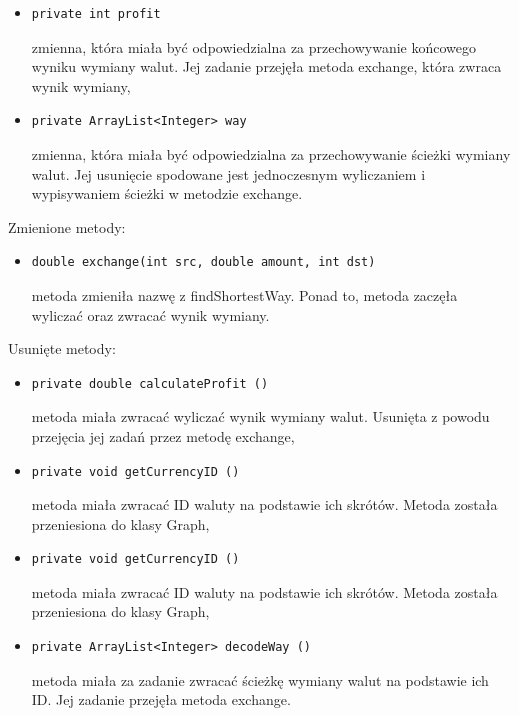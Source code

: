 \documentclass[12pt]{article}
\begin{document}
\begin{enumerate}
\begin{itemize}
    \end{itemize}
    \begin{itemize}
     \item \begin{verbatim}private int profit\end{verbatim}
        zmienna, która miała być odpowiedzialna za przechowywanie końcowego wyniku wymiany walut. Jej zadanie przejęła metoda exchange, która zwraca wynik wymiany,
    \end{itemize}
    \begin{itemize}
     \item \begin{verbatim}private ArrayList<Integer> way\end{verbatim}
        zmienna, która miała być odpowiedzialna za przechowywanie ścieżki wymiany walut. Jej usunięcie spodowane jest jednoczesnym wyliczaniem i wypisywaniem ścieżki w metodzie exchange.
    \end{itemize}
    Zmienione metody:
    \begin{itemize}
     \item \begin{verbatim}double exchange(int src, double amount, int dst)\end{verbatim}
        metoda zmieniła nazwę z findShortestWay. Ponad to, metoda zaczęła wyliczać oraz zwracać wynik wymiany.
    \end{itemize}
    Usunięte metody:
    \begin{itemize}
     \item \begin{verbatim}private double calculateProfit ()\end{verbatim}
        metoda miała zwracać wyliczać wynik wymiany walut. Usunięta z powodu przejęcia jej zadań przez metodę exchange,
    \end{itemize}
    \begin{itemize}
     \item \begin{verbatim}private void getCurrencyID ()\end{verbatim}
        metoda miała zwracać ID waluty na podstawie ich skrótów. Metoda została przeniesiona do klasy Graph,
    \end{itemize}
    \begin{itemize}
     \item \begin{verbatim}private void getCurrencyID ()\end{verbatim}
        metoda miała zwracać ID waluty na podstawie ich skrótów. Metoda została przeniesiona do klasy Graph,
    \end{itemize}
    \begin{itemize}
     \item \begin{verbatim}private ArrayList<Integer> decodeWay ()\end{verbatim}
        metoda miała za zadanie zwracać ścieżkę wymiany walut na podstawie ich ID. Jej zadanie przejęła metoda exchange.
    \end{itemize}
\end{enumerate}
\end{document}
